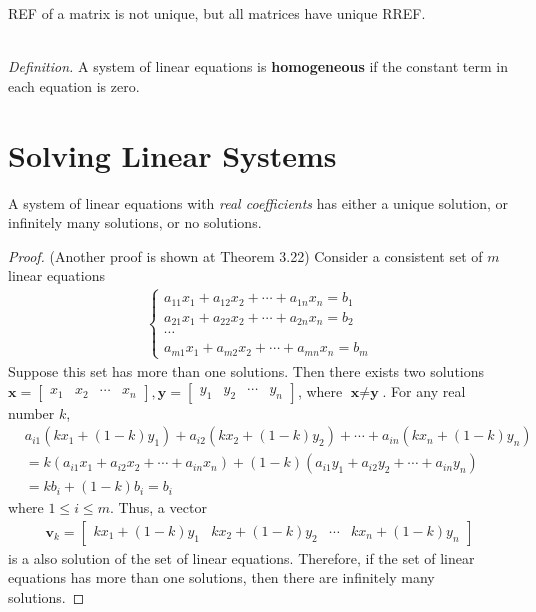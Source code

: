\noindent REF of a matrix is not unique, but all matrices have unique RREF.

\noindent \\ \textit{Definition.} A system of linear equations is \textbf{homogeneous} if the constant term in each equation is zero.

\section{Solving Linear Systems}

A system of linear equations with \textit{real coefficients} has either a unique solution, or infinitely many solutions, or no solutions.
\begin{proof} (Another proof is shown at Theorem 3.22)
	Consider a consistent set of $m$ linear equations
	\begin{align*}
		\begin{cases}
			a_{11}x_1 + a_{12}x_2 + \cdots + a_{1n}x_n = b_1 \\
			a_{21}x_1 + a_{22}x_2 + \cdots + a_{2n}x_n = b_2 \\
			\cdots \\
			a_{m1}x_1 + a_{m2}x_2 + \cdots + a_{mn}x_n = b_m
		\end{cases}
	\end{align*}
	Suppose this set has more than one solutions. Then there exists two solutions $\textbf{x} = \begin{bmatrix}
	x_1 & x_2 & \cdots & x_n
	\end{bmatrix}, \textbf{y} = \begin{bmatrix}
	y_1 &y _2 & \cdots & y_n
	\end{bmatrix}$, where $\textbf{x} \neq \textbf{y}$. For any real number $k$,
	\begin{align*}
		&a_{i1}(kx_1 + (1-k)y_1) + a_{i2}(kx_2 + (1-k)y_2) + \cdots + a_{in}(kx_n + (1-k)y_n) \\
		&= k(a_{i1}x_1 + a_{i2}x_2 + \cdots + a_{in}x_n) + (1-k)(a_{i1}y_1 + a_{i2}y_2 + \cdots + a_{in}y_n) \\
		&= kb_i + (1-k)b_i = b_i
	\end{align*}
	where $1 \le i \le m$.
	Thus, a vector
	\begin{align*}
		\textbf{v}_k = \begin{bmatrix}
		kx_1 + (1-k)y_1 & kx_2 + (1-k)y_2 & \cdots & kx_n + (1-k)y_n
		\end{bmatrix}
	\end{align*} is a also solution of the set of linear equations.
	Therefore, if the set of linear equations has more than one solutions, then there are infinitely many solutions.
\end{proof}

